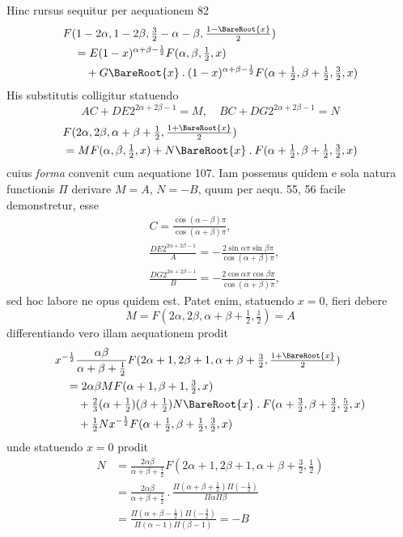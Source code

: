 Hinc rursus sequitur per aequationem 82
\[
\begin{aligned}
&F(1-2\alpha,1-2\beta,\tfrac32-\alpha-\beta,\tfrac{1-\BareRoot{x}}2)\\
&\quad=E(1-x)^{\alpha+\beta-\frac12}F(\alpha,\beta,\tfrac12,x)\\&\qquad+G\BareRoot{x}\mathbin{.}(1-x)^{\alpha+\beta-\frac12}F(\alpha+\tfrac12,\beta+\tfrac12,\tfrac32,x)
\end{aligned}
\]
His substitutis colligitur statuendo
\[
AC+DE2^{2\alpha+2\beta-1}=M,\quad BC+DG2^{2\alpha+2\beta-1}=N
\]
\[
\begin{aligned}&F(2\alpha,2\beta,\alpha+\beta+\tfrac12,\tfrac{1+\BareRoot{x}}2)\\&=MF(\alpha,\beta,\tfrac12,x)+N\BareRoot{x}\mathbin{.}F(\alpha+\tfrac12,\beta+\tfrac12,\tfrac32,x)\end{aligned}
\]
cuius \textit{forma} convenit cum aequatione 107. Iam possemus quidem e sola natura
functionis $\Pi$ derivare $M=A$, $N=-B$, quum per aequ. 55, 56 facile demonstretur, esse
\[
\begin{aligned}&C=\frac{\cos(\alpha-\beta)\pi}{\cos(\alpha+\beta)\pi},\\&
\frac{DE2^{2\alpha+2\beta-1}}A=-\frac{2\sin\alpha\pi\sin\beta\pi}{\cos(\alpha+\beta)\pi},\\&
\frac{DG2^{2\alpha+2\beta-1}}B=-\frac{2\cos\alpha\pi\cos\beta\pi}{\cos(\alpha+\beta)\pi},\end{aligned}
\]
sed hoc labore ne opus quidem est. Patet enim, statuendo $x=0$, fieri debere
\[
M=F(2\alpha,2\beta,\alpha+\beta+\tfrac12,\tfrac12)=A
\]
differentiando vero illam aequationem prodit
\[
\begin{aligned}
&x^{-\frac12}\frac{\alpha\beta}{\alpha+\beta+\tfrac12}F(2\alpha+1,2\beta+1,\alpha+\beta+\tfrac32,\tfrac{1+\BareRoot{x}}2)\\
&\quad=2\alpha\beta MF(\alpha+1,\beta+1,\tfrac32,x)\\
&\qquad+\tfrac23(\alpha+\tfrac12)(\beta+\tfrac12)N\BareRoot{x}\mathbin{.}F(\alpha+\tfrac32,\beta+\tfrac32,\tfrac52,x)\\&\qquad+\tfrac12Nx^{-\frac12}F(\alpha+\tfrac12,\beta+\tfrac12,\tfrac32,x)
\end{aligned}
\]
unde statuendo $x=0$ prodit
\[
\begin{aligned}
N&=\frac{2\alpha\beta}{\alpha+\beta+\tfrac12}F(2\alpha+1,2\beta+1,\alpha+\beta+\tfrac32,\tfrac12)\\
&=\frac{2\alpha\beta}{\alpha+\beta+\tfrac12}\mathbin{.}\frac{\Pi(\alpha+\beta+\tfrac12)\Pi(-\tfrac12)}{\Pi\alpha\Pi\beta}\\
&=\frac{\Pi(\alpha+\beta-\tfrac12)\Pi(-\tfrac32)}{\Pi(\alpha-1)\Pi(\beta-1)}=-B
\end{aligned}
\]
